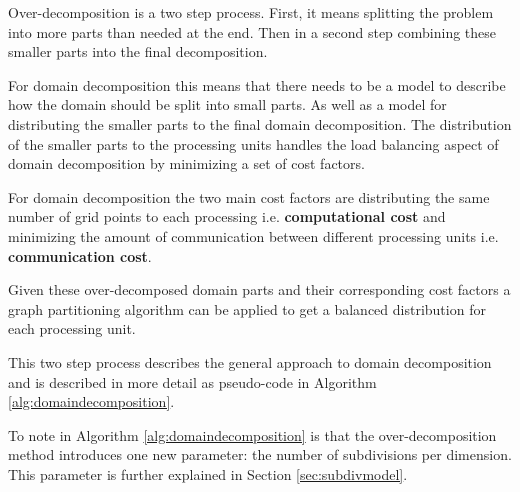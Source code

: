 Over-decomposition is a two step process.
First, it means splitting the problem into more parts than needed at the end.
Then in a second step combining these smaller parts into the final decomposition.

For domain decomposition this means that there needs to be a model to describe how the domain should be split into small parts.
As well as a model for distributing the smaller parts to the final domain decomposition.
The distribution of the smaller parts to the processing units handles the load balancing aspect of domain decomposition by minimizing a set of cost factors.

For domain decomposition the two main cost factors are distributing the same number of grid points to each processing i.e. \textbf{computational cost} and minimizing the amount of communication between different processing units i.e. \textbf{communication cost}.

Given these over-decomposed domain parts and their corresponding cost factors a graph partitioning algorithm can be applied to get a balanced distribution for each processing unit.

This two step process describes the general approach to domain decomposition and is described in more detail as pseudo-code in Algorithm \ref{alg:domaindecomposition}.

To note in Algorithm \ref{alg:domaindecomposition} is that the over-decomposition method introduces one new parameter: the number of subdivisions per dimension.
This parameter is further explained in Section \ref{sec:subdivmodel}.

